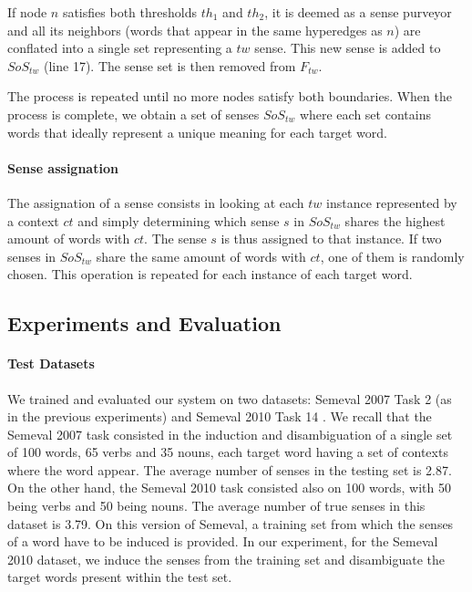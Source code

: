 If node $n$ satisfies both thresholds $th_1$ and $th_2$, it is deemed as a sense purveyor and all its neighbors (words that appear in the same hyperedges as $n$) are conflated into a single set representing a $tw$ sense. This new sense is added to $SoS_{tw}$ (line 17). The sense set is then removed from $F_{tw}$.

The process is repeated until no more nodes satisfy both boundaries. When the process is complete, we obtain a set of senses $SoS_{tw}$ where each set contains words that ideally represent a unique meaning for each target word. 

\paragraph{Sense assignation}

The assignation of a sense consists in looking at each $tw$ instance represented by a context $ct$ and simply determining which sense $s$ in $SoS_{tw}$ shares the highest amount of words with $ct$. The sense $s$ is thus assigned to that instance. If two senses in $SoS_{tw}$ share the same amount of words with $ct$, one of them is randomly chosen.  This operation is repeated for each instance of each target word. 



	
\subsection{Experiments and Evaluation}
\paragraph{Test Datasets}
We trained and evaluated our system on two datasets: Semeval 2007 Task 2 (as in the previous experiments) and Semeval 2010 Task 14 \cite{Semeval2010}. We recall that the Semeval 2007 task consisted in the induction and disambiguation of a single set of 100 words, 65 verbs and 35 nouns, each target word having a set of contexts where the word appear. The average number of senses in the testing set is 2.87. On the other hand, the Semeval 2010 task consisted also on 100 words, with 50 being verbs and 50 being nouns. The average number of true senses in this dataset is 3.79. On this version of Semeval, a training set from which the senses of a word have to be induced is provided. In our experiment, for the Semeval 2010 dataset, we induce the senses from the training set and disambiguate the target words present within the test set.


